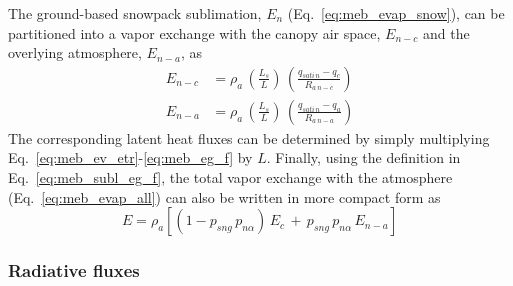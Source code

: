 The ground-based snowpack sublimation, $E_n$ (Eq.~\ref{eq:meb_evap_snow}), 
can be partitioned into a
vapor exchange
with the canopy air space, $E_{n-c}$ and the overlying atmosphere,
$E_{n-a}$, as
%
\begin{align}
\label{eq:meb_subl_eg_l}
%
E_{n-c} &= \rho_a \, \left({\frac{L_s}{L}}\right)\,
\left({\frac{q_{sati\,n} - q_c}
{R_{a\,n-c}}}\right)
\\
\label{eq:meb_subl_eg_f}
%
E_{n-a} &= \rho_a \, \left({\frac{L_s}{L}}\right)\,
\left({\frac{q_{sati\,n} - q_a}
{R_{a\,n-a}}}\right)
%
\end{align}
%
The corresponding latent heat fluxes can be determined by simply
multiplying Eq.~\ref{eq:meb_ev_etr}-\ref{eq:meb_eg_f} by $L$.
%
Finally, using the definition in Eq.~\ref{eq:meb_subl_eg_f},
the total vapor exchange with the atmosphere 
(Eq.~\ref{eq:meb_evap_all})
can also be written in more compact form as
%
\begin{equation}
E = \rho_a \left[
\left(1-p_{sng}\,p_{n\alpha}\right) \, E_c
\,+\,
p_{sng}\,p_{n\alpha} \, E_{n-a}
\right]
\end{equation}



\subsubsection{Radiative fluxes}
\label{sec:meb_energy_budget_rad}

